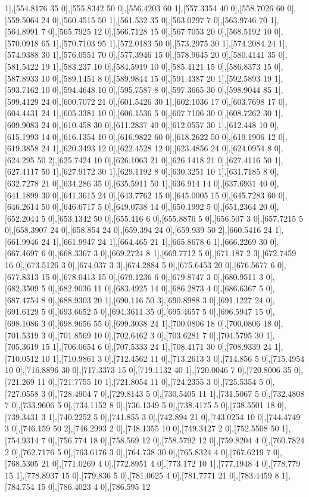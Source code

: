 {1],[554.8176 35 0],[555.8342 50 0],[556.4203 60 1],[557.3354 40 0],[558.7026 60 0],[559.5064 24 0],[560.4515 50 1],[561.532 35 0],[563.0297 7 0],[563.9746 70 1],[564.8991 7 0],[565.7925 12 0],[566.7128 15 0],[567.7053 20 0],[568.5192 10 0],[570.0918 65 1],[570.7103 95 1],[572.0183 50 0],[573.2975 30 1],[574.2084 24 1],[574.9388 30 1],[576.0551 70 0],[577.3946 15 0],[578.9645 20 0],[580.4141 35 0],[581.5422 19 1],[583.237 10 0],[584.5919 10 0],[585.4121 15 0],[586.8373 15 0],[587.8933 10 0],[589.1451 8 0],[589.9844 15 0],[591.4387 20 1],[592.5893 19 1],[593.7162 10 0],[594.4648 10 0],[595.7587 8 0],[597.3665 30 0],[598.9044 85 1],[599.4129 24 0],[600.7072 21 0],[601.5426 30 1],[602.1036 17 0],[603.7698 17 0],[604.4431 24 1],[605.3381 10 0],[606.1536 5 0],[607.7106 30 0],[608.7262 30 1],[609.9083 24 0],[610.458 30 0],[611.2837 40 0],[612.0557 30 1],[612.448 10 0],[615.1993 14 0],[616.1354 10 0],[616.9822 60 0],[618.2622 50 0],[619.1906 12 0],[619.3858 24 1],[620.3493 12 0],[622.4528 12 0],[623.4856 24 0],[624.0954 8 0],[624.295 50 2],[625.7424 10 0],[626.1063 21 0],[626.1418 21 0],[627.4116 50 1],[627.4117 50 1],[627.9172 30 1],[629.1192 8 0],[630.3251 10 1],[631.7185 8 0],[632.7278 21 0],[634.286 35 0],[635.5911 50 1],[636.914 14 0],[637.6931 40 0],[641.1899 30 0],[641.3615 24 0],[643.7762 15 0],[645.0005 15 0],[645.7283 60 0],[646.2614 50 0],[646.6717 5 0],[649.0738 14 0],[650.1992 5 0],[651.2364 20 0],[652.2044 5 0],[653.1342 50 0],[655.416 6 0],[655.8876 5 0],[656.507 3 0],[657.7215 5 0],[658.3907 24 0],[658.854 24 0],[659.394 24 0],[659.939 50 2],[660.5416 24 1],[661.9946 24 1],[661.9947 24 1],[664.465 21 1],[665.8678 6 1],[666.2269 30 0],[667.4697 6 0],[668.3367 3 0],[669.2724 8 1],[669.7712 5 0],[671.187 2 3],[672.7459 16 0],[673.5126 3 0],[674.037 3 3],[674.2884 5 0],[675.6453 20 0],[676.5677 6 0],[677.8313 15 0],[678.0413 15 0],[679.1236 6 0],[679.8747 3 0],[680.9511 3 0],[682.3509 5 0],[682.9036 11 0],[683.4925 14 0],[686.2873 4 0],[686.6367 5 0],[687.4754 8 0],[688.9303 20 1],[690.116 50 3],[690.8988 3 0],[691.1227 24 0],[691.6129 5 0],[693.6652 5 0],[694.3611 35 0],[695.4657 5 0],[696.5947 15 0],[698.1086 3 0],[698.9656 55 0],[699.3038 24 1],[700.0806 18 0],[700.0806 18 0],[701.5319 3 0],[701.8569 10 0],[702.6462 3 0],[703.6281 7 0],[704.5795 30 1],[705.3619 15 1],[706.0654 6 0],[707.5333 24 1],[708.4171 30 0],[708.9339 24 1],[710.0512 10 1],[710.9861 3 0],[712.4562 11 0],[713.2613 3 0],[714.856 5 0],[715.4954 10 0],[716.8896 30 0],[717.3373 15 0],[719.1132 40 1],[720.0046 7 0],[720.8006 35 0],[721.269 11 0],[721.7755 10 1],[721.8054 11 0],[724.2355 3 0],[725.5354 5 0],[727.0558 3 0],[728.4904 7 0],[729.8143 5 0],[730.5405 11 1],[731.5067 5 0],[732.4808 7 0],[733.9606 5 0],[734.1152 8 0],[736.1349 5 0],[738.4175 5 0],[738.5501 18 0],[739.3431 3 1],[740.2252 5 0],[741.855 3 0],[742.894 21 0],[743.0254 10 0],[744.4749 3 0],[746.159 50 2],[746.2993 2 0],[748.1355 10 0],[749.3427 2 0],[752.5508 50 1],[754.9314 7 0],[756.774 18 0],[758.569 12 0],[758.5792 12 0],[759.8204 4 0],[760.7824 2 0],[762.7176 5 0],[763.6176 3 0],[764.738 30 0],[765.8324 4 0],[767.6219 7 0],[768.5305 21 0],[771.0269 4 0],[772.8951 4 0],[773.172 10 1],[777.1948 4 0],[778.779 15 1],[778.8937 15 0],[779.836 5 0],[781.0625 4 0],[781.7771 21 0],[783.4459 8 1],[784.754 15 0],[786.4023 4 0],[786.595 12 }
